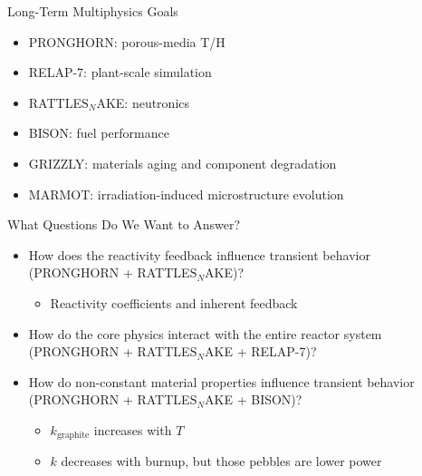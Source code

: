 \documentclass{beamer}
\begin{document}

\begin{frame}{Long-Term Multiphysics Goals}

\begin{itemize}
\item PRONGHORN: porous-media T/H
\item RELAP-7: plant-scale simulation
\item RATTLE\(\textrm{S}_N\)AKE: neutronics
\item BISON: fuel performance
\item GRIZZLY: materials aging and component degradation
\item MARMOT: irradiation-induced microstructure evolution
\end{itemize}

\end{frame}



\begin{frame}{What Questions Do We Want to Answer?}

\begin{itemize}
\item How does the reactivity feedback influence transient behavior (PRONGHORN + RATTLE\(\textrm{S}_N\)AKE)?
	\begin{itemize}
		\item Reactivity coefficients and inherent feedback\newline
	\end{itemize}
\item How do the core physics interact with the entire reactor system (PRONGHORN + RATTLE\(\textrm{S}_N\)AKE + RELAP-7)?\newline
\item How do non-constant material properties influence transient behavior (PRONGHORN + RATTLE\(\textrm{S}_N\)AKE + BISON)?
	\begin{itemize}
		\item \(k_{\textrm{graphite}}\) increases with \(T\)
		\item \(k\) decreases with burnup, but those pebbles are lower power
	\end{itemize}
\end{itemize}

\end{frame}
\end{document}

